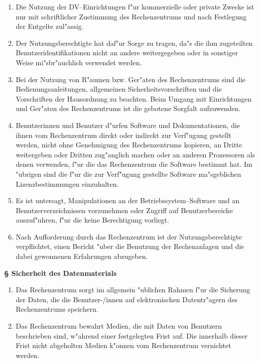 \documentclass[12pt,titlepage,twoside]{scrartcl}
\newcounter{para_nr}
\newcommand{\Paragraph}[1]{{\large\bf\S{}\sf\textbf{\/\stepcounter{para_nr}\arabic{para_nr} #1}}}
\begin{document}
\begin{appendix}
\begin{enumerate}
  \item Die Nutzung der DV--Einrichtungen f"ur kommerzielle oder private
    Zwecke ist nur mit schriftlicher Zustimmung des Rechenzentrums und
    nach Festlegung der Entgelte zul"assig.

  \item Der Nutzungsberechtigte hat daf"ur Sorge zu tragen, da"s die
    ihm zugeteilten Benutzeridentifikationen nicht an andere weitergegeben
    oder in sonstiger Weise mi"sbr"auchlich verwendet werden.

  \item Bei der Nutzung von R"aumen bzw. Ger"aten des Rechenzentrums
    sind die Bedienungsanleitungen, allgemeinen Sicherheitsvorschriften
    und die Vorschriften der Hausordnung zu beachten. Beim Umgang mit
    Einrichtungen und Ger"aten des Rechenzentrums ist die gebotene
    Sorgfalt aufzuwenden.

  \item Benutzerinnen und Benutzer d"urfen Software und Dokumentationen,
    die ihnen vom Rechenzentrum direkt oder indirekt zur Verf"ugung
    gestellt werden, nicht ohne Genehmigung des Rechenzentrums kopieren,
    an Dritte weitergeben oder Dritten zug"anglich machen oder an
    anderen Prozessoren als denen verwenden, f"ur die das Rechenzentrum
    die Software bestimmt hat. Im "ubrigen sind die f"ur die
    zur Verf"ugung gestellte Software ma"sgeblichen
    Lizenzbestimmungen einzuhalten.

  \item Es ist untersagt, Manipulationen an der Betriebssystem--Software
    und an Benutzerverzeichnissen vorzunehmen oder Zugriff auf
    Benutzerbereiche auszuf"uhren, f"ur die keine Berechtigung
    vorliegt.

  \item Nach Aufforderung durch das Rechenzentrum ist der Nutzungsberechtigte
    verpflichtet, einen Bericht "uber die Benutzung der Rechenanlagen
    und die dabei gewonnenen Erfahrungen abzugeben.
\end{enumerate}

\Paragraph{Sicherheit des Datenmaterials}

\begin{enumerate}
  \item Das Rechenzentrum sorgt im allgemein "ublichen Rahmen f"ur
    die Sicherung der Daten, die die Benutzer-/innen auf elektronischen
    Datentr"agern des Rechenzentrums speichern.

  \item Das Rechenzentrum bewahrt Medien, die mit Daten von Benutzern
    beschrieben sind, w"ahrend einer festgelegten Frist auf. Die
    innerhalb dieser Frist nicht abgeholten Medien k"onnen vom
    Rechenzentrum vernichtet werden.
\end{enumerate}


\end{appendix}
\end{document}
